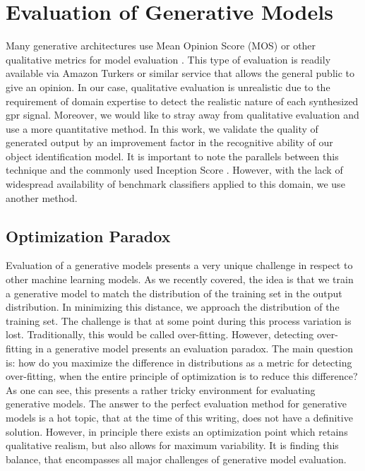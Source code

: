 \section{Evaluation of Generative Models} \label{Evaluation of Generative Models}

\hspace{0.5in}Many generative architectures use Mean Opinion Score (MOS) or other qualitative metrics for model evaluation \cite{MOS}. This type of evaluation is readily available via Amazon Turkers or similar service that allows the general public to give an opinion. In our case, qualitative evaluation is unrealistic due to the requirement of domain expertise to detect the realistic nature of each synthesized \acrshort{gpr} signal. Moreover, we would like to stray away from qualitative evaluation and use a more quantitative method. In this work, we validate the quality of generated output by an improvement factor in the recognitive ability of our object identification model. It is important to note the parallels between this technique and the commonly used Inception Score \cite{inception}. However, with the lack of widespread availability of benchmark classifiers applied to this domain, we use another method.

\subsection{Optimization Paradox}\label{paradox}
\hspace{0.5in}Evaluation of a generative models presents a very unique challenge in respect to other machine learning models. As we recently covered, the idea is that we train a generative model to match the distribution of the training set in the output distribution. In minimizing this distance, we approach the distribution of the training set. The challenge is that at some point during this process variation is lost. Traditionally, this would be called over-fitting. However, detecting over-fitting in a generative model presents an evaluation paradox. The main question is: how do you maximize the difference in distributions as a metric for detecting over-fitting, when the entire principle of optimization is to reduce this difference? As one can see, this presents a rather tricky environment for evaluating generative models. The answer to the perfect evaluation method for generative models is a hot topic, that at the time of this writing, does not have a definitive solution. However, in principle there exists an optimization point which retains qualitative realism, but also allows for maximum variability. It is finding this balance, that encompasses all major challenges of generative model evaluation.


